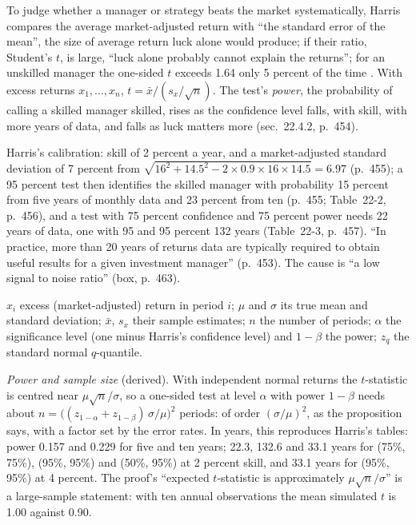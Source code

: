 \begin{qfmethod}\label{meth:skill-luck-significance-tests}
 To judge whether a manager or strategy beats the market systematically, Harris compares the average market-adjusted return with ``the standard error of the mean'', the size of average return luck alone would produce; if their ratio, Student's $t$, is large, ``luck alone probably cannot explain the returns''; for an unskilled manager the one-sided $t$ exceeds 1.64 only 5 percent of the time \citep[chap.~22, sec.~22.4.1, p.~453]{alpha-harris}. With excess returns $x_1,\dots,x_n$, $t=\bar x/(s_x/\sqrt n)$. The test's \emph{power}, the probability of calling a skilled manager skilled, rises as the confidence level falls, with skill, with more years of data, and falls as luck matters more (sec.~22.4.2, p.~454).

Harris's calibration: skill of 2 percent a year, and a market-adjusted standard deviation of 7 percent from $\sqrt{16^2+14.5^2-2\times0.9\times16\times14.5}=6.97$ (p.~455); a 95 percent test then identifies the skilled manager with probability 15 percent from five years of monthly data and 23 percent from ten (p.~455; Table~22-2, p.~456), and a test with 75 percent confidence and 75 percent power needs 22 years of data, one with 95 and 95 percent 132 years (Table~22-3, p.~457). ``In practice, more than 20 years of returns data are typically required to obtain useful results for a given investment manager'' (p.~453). The cause is ``a low signal to noise ratio'' (box, p.~463).

 $x_i$ excess (market-adjusted) return in period $i$; $\mu$ and $\sigma$ its true mean and standard deviation; $\bar x$, $s_x$ their sample estimates; $n$ the number of periods; $\alpha$ the significance level (one minus Harris's confidence level) and $1-\beta$ the power; $z_q$ the standard normal $q$-quantile.

 \emph{Power and sample size} (derived). With independent normal returns the $t$-statistic is centred near $\mu\sqrt n/\sigma$, so a one-sided test at level $\alpha$ with power $1-\beta$ needs about $n=\bigl((z_{1-\alpha}+z_{1-\beta})\,\sigma/\mu\bigr)^2$ periods: of order $(\sigma/\mu)^2$, as the proposition says, with a factor set by the error rates. In years, this reproduces Harris's tables: power 0.157 and 0.229 for five and ten years; 22.3, 132.6 and 33.1 years for (75\%, 75\%), (95\%, 95\%) and (50\%, 95\%) at 2 percent skill, and 33.1 years for (95\%, 95\%) at 4 percent. The proof's ``expected $t$-statistic is approximately $\mu\sqrt n/\sigma$'' is a large-sample statement: with ten annual observations the mean simulated $t$ is 1.00 against 0.90.


\end{qfmethod}

